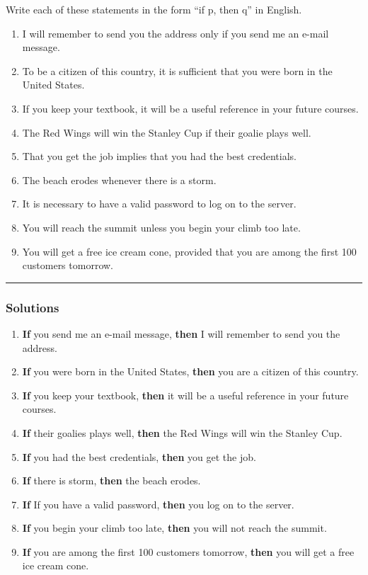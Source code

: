 \newpage
\begin{question}
Write each of these statements in the form “if p, then q” in English.
\begin{enumerate}
\item I will remember to send you the address only if you send me an e-mail message.
\item To be a citizen of this country, it is sufficient that you were born in the United States.
\item If you keep your textbook, it will be a useful reference in your future courses.
\item The Red Wings will win the Stanley Cup if their goalie plays well.
\item That you get the job implies that you had the best credentials.
\item The beach erodes whenever there is a storm.
\item It is necessary to have a valid password to log on to the server.
\item You will reach the summit unless you begin your climb too late.
\item You will get a free ice cream cone, provided that you are among the first 100 customers tomorrow.
\end{enumerate}
\end{question}

\par\noindent\rule{\textwidth}{0.5pt}

\subsubsection*{Solutions}

\begin{enumerate}

\item \textbf{If} you send me an e-mail message, \textbf{then} I will remember to send you the address.
\item \textbf{If} you were born in the United States, \textbf{then} you are a citizen of this country.
\item \textbf{If} you keep your textbook, \textbf{then} it will be a useful reference in your future courses.
\item \textbf{If} their goalies plays well, \textbf{then} the Red Wings will win the Stanley Cup.
\item \textbf{If} you had the best credentials, \textbf{then} you get the job.
\item \textbf{If} there is storm, \textbf{then} the beach erodes.
\item \textbf{If} If you have a valid password, \textbf{then} you log on to the server.
\item \textbf{If} you begin your climb too late, \textbf{then} you will not reach the summit.
\item \textbf{If} you are among the first 100 customers tomorrow, \textbf{then} you will get a free ice cream cone.

\end{enumerate}